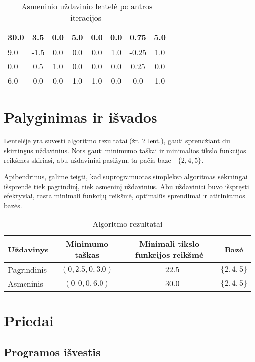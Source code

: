 \documentclass[a4paper,12pt,fleqn]{article}
\begin{document}
\begin{table}[h!]
\centering
\caption{Asmeninio uždavinio lentelė po antros iteracijos.}
\label{tab:personal_task_table2}
\begin{tabular}{@{}lccccccc@{}}
\toprule
30.0 & 3.5 & 0.0 & 5.0 & 0.0 & 0.0 & 0.75 & 5.0 \\ \midrule
9.0 & -1.5 & 0.0 & 0.0 & 0.0 & 1.0 & -0.25 & 1.0 \\
0.0 & 0.5 & 1.0 & 0.0 & 0.0 & 0.0 & 0.25 & 0.0 \\
6.0 & 0.0 & 0.0 & 1.0 & 1.0 & 0.0 & 0.0 & 1.0 \\ \bottomrule
\end{tabular}
\end{table}

\pagebreak
\section{Palyginimas ir išvados}

Lentelėje yra suvesti algoritmo rezultatai (žr. \ref{tab:results} lent.), gauti sprendžiant du skirtingus uždavinius.
Nors gauti minimumo taškai ir minimalios tikslo funkcijos reikšmės skiriasi, abu uždaviniai pasižymi ta pačia baze - $\{2, 4, 5\}$.

Apibendrinus, galime teigti, kad suprogramuotas simplekso algoritmas sėkmingai išsprendė tiek pagrindinį, tiek asmeninį uždavinius. Abu uždaviniai buvo išspręsti efektyviai, rasta minimali funkcijų reikšmė, optimalūs sprendimai ir atitinkamos bazės.

\begin{table}[h!]
\centering
\caption{Algoritmo rezultatai}
\begin{tabular}{@{}lccc@{}}
\toprule
Uždavinys & Minimumo taškas & Minimali tikslo funkcijos reikšmė & Bazė \\ \midrule
Pagrindinis & $\left(0, 2.5, 0, 3.0\right)$ & $-22.5$ & $\{2, 4, 5\}$ \\
Asmeninis & $\left(0, 0, 0, 6.0\right)$ & $-30.0$ & $\{2, 4, 5\}$ \\ \bottomrule
\end{tabular}
\label{tab:results}
\end{table}

\pagebreak
\section{Priedai}
\subsection{Programos išvestis} \label{output}
\end{document}
